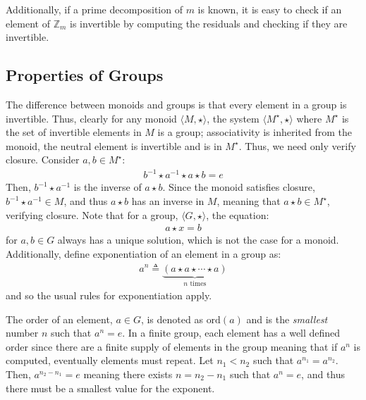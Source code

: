 \documentclass[]{book}
\newcommand{\ix}[1]{%
  \leavevmode %
  \marginpar{\small\emph{#1}}%
}
\begin{document}
Additionally, if a prime decomposition of $m$ is known, it is easy to check if an element of $\mathbb{Z}_m$ is invertible by computing the residuals and checking if they are invertible. 

\subsection{Properties of Groups}
The difference between monoids and groups is that every element in a group is invertible. Thus, clearly for any monoid $\langle M, \star \rangle$, the system $\langle M^\star, \star \rangle$ where $M^\star$ is the set of invertible elements in $M$ is a group; associativity is inherited from the monoid, the neutral element is invertible and is in $M^\star$.\ix{Verify Closure} Thus, we need only verify closure. Consider $a, b \in M^\star$:
\begin{align}
b^{-1} \star a^{-1} \star a \star b = e
\end{align}
Then, $b^{-1} \star a^{-1}$ is the inverse of $a \star b$. Since the monoid satisfies closure, $b^{-1} \star a^{-1} \in M$, and thus $a \star b$ has an inverse in $M$, meaning that $a\star b \in M^\star$, verifying closure. Note that for a group, $\langle G, \star \rangle$, the equation:
\begin{align}
a \star x = b
\end{align}
for $a, b \in G$ always has a unique solution, which is not the case for a monoid. Additionally, define exponentiation of an element in a group as:
\begin{align}
a^n \triangleq \underbrace{(a \star a \star  \cdots \star a)}_{n\text{ times}}
\end{align}
and so the usual rules for exponentiation apply.  

\ix{Order of an Element}The order of an element, $a \in G$, is denoted as $\text{ord}(a)$ and is the \emph{smallest} number $n$ such that $a^n = e$. In a finite group, each element has a well defined order since there are a finite supply of elements in the group meaning that if $a^n$ is computed, eventually elements must repeat. Let $n_1 < n_2$ such that $a^{n_1} = a^{n_2}$. Then, $a^{n_2 - n_1} = e$ meaning there exists $n = n_2 - n_1$ such that $a^n=e$, and thus there must be a smallest value for the exponent. 
\end{document}
